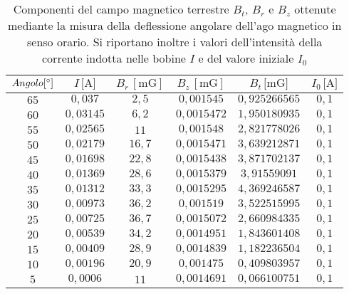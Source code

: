 \documentclass[]{article}
\begin{document}
\begin{table}
    \centering


\begin{tabular}{||c|c|c|c|c|c||}
    \hline
    $Angolo [\text{\degree}] $ & $I\, \text{[A]} $ & $B_r\, [\text{mG}] $ & $B_z\, [\text{mG}] $ & $B_t\, \text{[mG]} $ & $I_0\, \text{[A]} $\\
    \hline\hline



    $65$ & $0,037  $ & $2,5 $ & $0,001545 $ & $0,925266565$ & $0,1$ \\\hline
    $60$ & $0,03145$ & $6,2 $ & $0,0015472$ & $1,950180935$ & $0,1$ \\\hline
    $55$ & $0,02565$ & $11  $ & $0,001548 $ & $2,821778026$ & $0,1$ \\\hline
    $50$ & $0,02179$ & $16,7$ & $0,0015471$ & $3,639212871$ & $0,1$ \\\hline
    $45$ & $0,01698$ & $22,8$ & $0,0015438$ & $3,871702137$ & $0,1$ \\\hline
    $40$ & $0,01369$ & $28,6$ & $0,0015379$ & $3,91559091 $ & $0,1$ \\\hline
    $35$ & $0,01312$ & $33,3$ & $0,0015295$ & $4,369246587$ & $0,1$ \\\hline
    $30$ & $0,00973$ & $36,2$ & $0,001519 $ & $3,522515995$ & $0,1$ \\\hline
    $25$ & $0,00725$ & $36,7$ & $0,0015072$ & $2,660984335$ & $0,1$ \\\hline
    $20$ & $0,00539$ & $34,2$ & $0,0014951$ & $1,843601408$ & $0,1$ \\\hline
    $15$ & $0,00409$ & $28,9$ & $0,0014839$ & $1,182236504$ & $0,1$ \\\hline
    $10$ & $0,00196$ & $20,9$ & $0,001475 $ & $0,409803957$ & $0,1$ \\\hline
    $5 $ & $0,0006 $ & $11  $ & $0,0014691$ & $0,066100751$ & $0,1$ \\\hline

\end{tabular}
\caption{Componenti del campo magnetico terrestre $B_t$, $B_r$ e $B_z$ ottenute mediante la misura della deflessione angolare dell'ago magnetico in senso orario. Si riportano inoltre i valori dell'intensità della corrente indotta nelle bobine $I$ e del valore iniziale $I_0$}
\label{campomagneticoterrestre_sensoorario}
\end{table}
\end{document}
